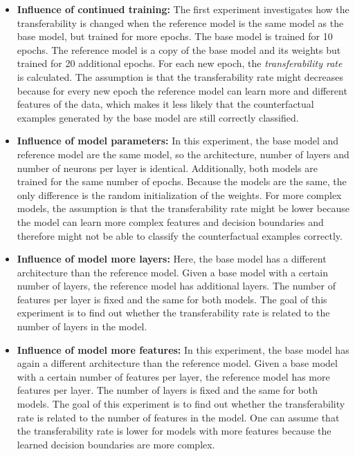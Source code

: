 \documentclass{article}
\begin{document}
\begin{itemize}
    \item \textbf{Influence of continued training:} The first experiment investigates how the transferability is changed when the reference model is the same model as the base model, but trained for more epochs. The base model is trained for 10 epochs. The reference model is a copy of the base model and its weights but trained for 20 additional epochs. For each new epoch, the \textit{transferability rate} is calculated. The assumption is that the transferability rate might decreases because for every new epoch the reference model can learn more and different features of the data, which makes it less likely that the counterfactual examples generated by the base model are still correctly classified.
    \item \textbf{Influence of model parameters:} In this experiment, the base model and reference model are the same model, so the architecture, number of layers and number of neurons per layer is identical. Additionally, both models are trained for the same number of epochs. Because the models are the same, the only difference is the random initialization of the weights. For more complex models, the assumption is that the transferability rate might be lower because the model can learn more complex features and decision boundaries and therefore might not be able to classify the counterfactual examples correctly. 
    \item \textbf{Influence of model more layers:} Here, the base model has a different architecture than the reference model. Given a base model with a certain number of layers, the reference model has additional layers. The number of features per layer is fixed and the same for both models. The goal of this experiment is to find out whether the transferability rate is related to the number of layers in the model. 
    \item \textbf{Influence of model more features:} In this experiment, the base model has again a different architecture than the reference model. Given a base model with a certain number of features per layer, the reference model has more features per layer. The number of layers is fixed and the same for both models. The goal of this experiment is to find out whether the transferability rate is related to the number of features in the model. One can assume that the transferability rate is lower for models with more features because the learned decision boundaries are more complex.
\end{itemize}
\end{document}
